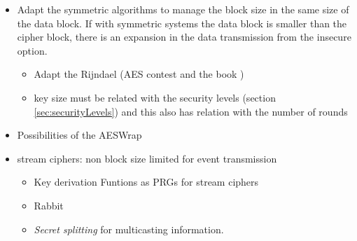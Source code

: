 \documentclass[10pt,a4paper,twoside]{llncs}
\begin{document}
    \begin{itemize}
        \item Adapt the symmetric algorithms to manage the block size in the same size of the data block. If with symmetric systems the data block is smaller than the cipher block, there is an expansion in the data transmission from the insecure option.
        \begin{itemize}
            \item Adapt the Rijndael \cite{gRijndael} (AES contest \cite{AES-FIPS} and the book \cite{Daemen:2002:DR:560131})
            \item key size must be related with the security levels (section \ref{sec:securityLevels}) and this also has relation with the number of rounds
        \end{itemize}
        \item Possibilities of the AESWrap \cite{rfc3394}
        \item stream ciphers: non block size limited for event transmission
        \begin{itemize}
            \item Key derivation Funtions as PRGs for stream ciphers
            \item Rabbit \cite{rfc4503}
            \item \emph{Secret splitting} for multicasting information.
        \end{itemize}
    \end{itemize}

    
\end{document}
